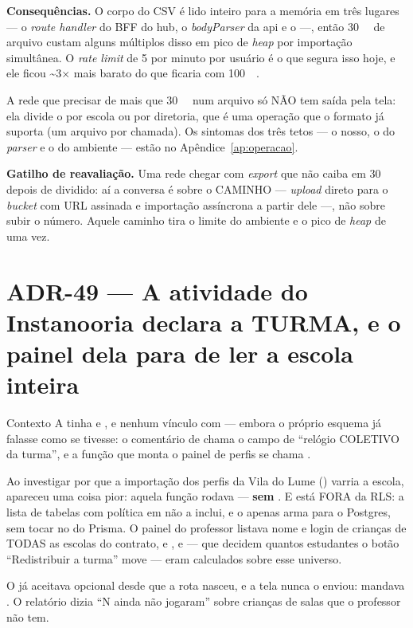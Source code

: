 \textbf{Consequências.} O corpo do CSV é lido inteiro para a memória em três
lugares --- o \emph{route handler} do BFF do hub, o \emph{bodyParser} da api e o
 ---, então \SI{30}{\mega\byte} de arquivo custam alguns múltiplos
disso em pico de \emph{heap} por importação simultânea. O \emph{rate limit} de
5 por minuto por usuário é o que segura isso hoje, e ele ficou
\textasciitilde3$\times$ mais barato do que ficaria com
\SI{100}{\mega\byte}.

A rede que precisar de mais que \SI{30}{\mega\byte} num arquivo só NÃO tem
saída pela tela: ela divide o  por escola ou por diretoria,
que é uma operação que o formato já suporta (um arquivo por chamada). Os
sintomas dos três tetos --- o nosso, o do \emph{parser} e o do ambiente ---
estão no Apêndice~\ref{ap:operacao}.

\textbf{Gatilho de reavaliação.} Uma rede chegar com \emph{export} que não caiba
em \SI{30}{\mega\byte} depois de dividido: aí a conversa é sobre o CAMINHO ---
\emph{upload} direto para o \emph{bucket} com URL assinada e importação
assíncrona a partir dele ---, não sobre subir o número. Aquele caminho tira o
limite do ambiente e o pico de \emph{heap} de uma vez.

\section{ADR-49 --- A atividade do Instanooria declara a TURMA, e o painel dela
para de ler a escola inteira}
\label{adr:atividade-por-turma}

\begin{especificacao}{Contexto}
A  tinha  e , e nenhum
vínculo com  --- embora o próprio esquema já falasse como se tivesse:
o comentário de  chama o campo de ``relógio COLETIVO da turma'', e a
função que monta o painel de perfis se chama .

Ao investigar por que a importação dos perfis da Vila do Lume
() varria a escola, apareceu uma coisa
pior: aquela função rodava 
--- \textbf{sem }. E  está FORA da RLS: a lista de
tabelas com política em  não a inclui, e o
 apenas arma  para o Postgres, sem tocar no
 do Prisma. O painel do professor listava nome e login de crianças de
TODAS as escolas do contrato, e ,  e
 --- que decidem quantos estudantes o botão
``Redistribuir a turma'' move --- eram calculados sobre esse universo.

O  já aceitava  opcional desde que a rota nasceu, e
a tela nunca o enviou: mandava \cd{\{\}}. O relatório dizia ``N ainda não
jogaram'' sobre crianças de salas que o professor não tem.
\end{especificacao}

